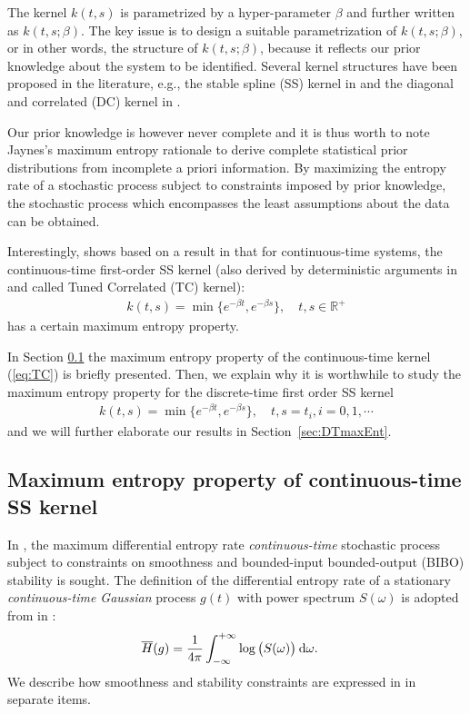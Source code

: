 \documentclass{article}
\renewcommand{\d}{\:{\rm{d}}}
\begin{document}
The kernel $k(t,s)$ is parametrized by a hyper-parameter $\beta$
and further written as $k(t,s;\beta)$. The key issue is to design a
suitable parametrization of $k(t,s;\beta)$, or in other words, the
structure of $k(t,s;\beta)$, because it reflects our prior knowledge
about the system to be identified. Several kernel structures  have
been proposed  in the literature, e.g., the
stable spline (SS) kernel in \cite{PN10a} and the diagonal and
correlated (DC) kernel in \cite{COL12a}.

Our prior knowledge is however never complete and it is thus worth
to note Jaynes's maximum entropy rationale \cite{jaynes} to derive
complete statistical prior distributions from incomplete a priori
information.  By maximizing the entropy rate of a stochastic process
subject to constraints imposed by prior knowledge, the stochastic
process which encompasses the least assumptions about the data can
be obtained.



Interestingly, \cite{pillonetto2011} shows based on a result in
\cite{DeTL98} that for continuous-time systems, the continuous-time
first-order SS kernel (also derived by  deterministic arguments in
\cite{COL12a} and called Tuned Correlated (TC) kernel):
\begin{align}\label{eq:TC}
  k(t,s) = \min\{e^{-\beta t},e^{-\beta s}\}, \quad t,s\in\mathbb
R^+
\end{align}
has a certain maximum entropy property.

In Section \ref{sec:CTmaxEnt} the maximum entropy
property of the continuous-time kernel (\ref{eq:TC}) is briefly presented.
Then, we explain why it is worthwhile to study the maximum entropy
property for the discrete-time first order SS kernel
\begin{align}\label{eq:TC_dt}
  k(t,s) = \min\{e^{-\beta t},e^{-\beta s}\}, \quad
  t,s=t_i,i=0,1,\cdots
\end{align} and we will further elaborate our results in Section~\ref{sec:DTmaxEnt}.




\subsection{Maximum entropy property of continuous-time SS kernel}
\label{sec:CTmaxEnt}

In \cite{pillonetto2011}, the maximum differential entropy rate
\emph{continuous-time} stochastic process subject to constraints on
smoothness and bounded-input bounded-output (BIBO) stability is
sought. The definition of the differential entropy rate of a stationary \emph{continuous-time
Gaussian} process $g(t)$ with power spectrum $S(\omega)$ is adopted from \cite{DeTL98} in \cite{pillonetto2011}:
\begin{align}\label{eq:def_De}
&\overline{H}(g)=\frac{1}{4\pi}\int_{-\infty}^{+\infty}{\log\big(S(\omega)\big) \d
\omega}.
\end{align}
 We describe how smoothness and stability constraints are expressed in \cite{pillonetto2011} in separate items.
\end{document}
